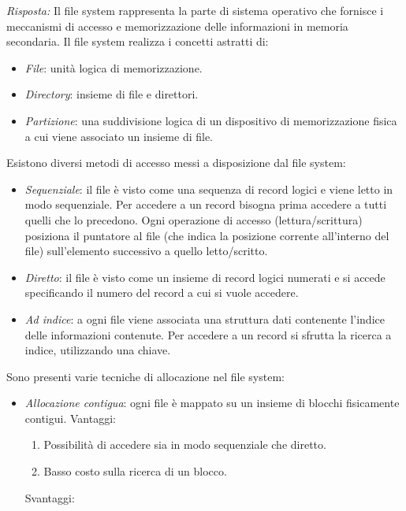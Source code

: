 \documentclass{article}
\newenvironment{solution}
    {\textit{Risposta:}}
    {}
\begin{document}
\begin{solution}
Il file system rappresenta la parte di sistema operativo che fornisce i meccanismi di accesso e memorizzazione delle informazioni in memoria secondaria.
\newline
Il file system realizza i concetti astratti di:
\begin{itemize}
    \item \emph{File}: unità logica di memorizzazione.
    \item \emph{Directory}: insieme di file e direttori.
    \item \emph{Partizione}: una suddivisione logica di un dispositivo di memorizzazione fisica a cui viene associato un insieme di file.
\end{itemize}
Esistono diversi metodi di accesso messi a disposizione dal file system:
\begin{itemize}
    \item \emph{Sequenziale}: il file è visto come una sequenza di record logici e viene letto in modo sequenziale. Per accedere a un record bisogna prima accedere a tutti quelli che lo precedono. Ogni operazione di accesso (lettura/scrittura) posiziona il puntatore al file (che indica la posizione corrente all’interno del file) sull’elemento successivo a quello letto/scritto.
    \item \emph{Diretto}: il file è visto come un insieme di record logici numerati e si accede specificando il numero del record a cui si vuole accedere.
    \item \emph{Ad indice}: a ogni file viene associata una struttura dati contenente l’indice delle informazioni contenute. Per accedere a un record si sfrutta la ricerca a indice, utilizzando una chiave.
\end{itemize}
Sono presenti varie tecniche di allocazione nel file system:
\begin{itemize}
    \item  \emph{Allocazione contigua}: ogni file è mappato su un insieme di blocchi fisicamente contigui.
    \newline
    \newline
    Vantaggi:
    \begin{enumerate}
        \item Possibilità di accedere sia in modo sequenziale che diretto.
        \item Basso costo sulla ricerca di un blocco.
    \end{enumerate}
    Svantaggi:
    \begin{enumerate}

\end{enumerate}
\end{itemize}
\end{solution}
\end{document}
